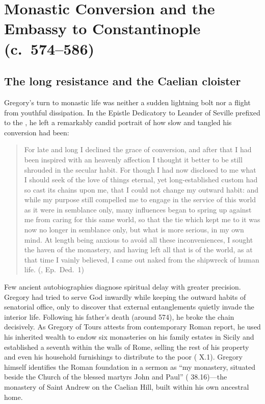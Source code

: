 \section{Monastic Conversion and the Embassy to Constantinople (c.~574--586)}

\subsection{The long resistance and the Caelian cloister}

Gregory's turn to monastic life was neither a sudden lightning bolt nor a flight
from youthful dissipation. In the Epistle Dedicatory to Leander of Seville
prefixed to the , he left a remarkably candid portrait of
how slow and tangled his conversion had been:

\begin{quote}
For late and long I declined the grace of conversion, and after that I had been
inspired with an heavenly affection I thought it better to be still shrouded in
the secular habit. For though I had now disclosed to me what I should seek of
the love of things eternal, yet long-established custom had so cast its chains
upon me, that I could not change my outward habit: and while my purpose still
compelled me to engage in the service of this world as it were in semblance
only, many influences began to spring up against me from caring for this same
world, so that the tie which kept me to it was now no longer in semblance only,
but what is more serious, in my own mind. At length being anxious to avoid all
these inconveniences, I sought the haven of the monastery, and having left all
that is of the world, as at that time I vainly believed, I came out naked from
the shipwreck of human life. (, Ep.\ Ded.\ 1)
\end{quote}

Few ancient autobiographies diagnose spiritual delay with greater precision.
Gregory had tried to serve God inwardly while keeping the outward habits of
senatorial office, only to discover that external entanglements quietly invade
the interior life. Following his father's death (around 574), he broke the
chain decisively. As Gregory of Tours attests from contemporary Roman report,
he used his inherited wealth to endow six monasteries on his family estates in
Sicily and established a seventh within the walls of Rome, selling the rest of
his property and even his household furnishings to distribute to the poor
( X.1). Gregory himself identifies the Roman
foundation in a sermon as ``my monastery, situated beside the Church of the
blessed martyrs John and Paul'' ( 38.16)---the
monastery of Saint Andrew  on the Caelian Hill, built
within his own ancestral home.

